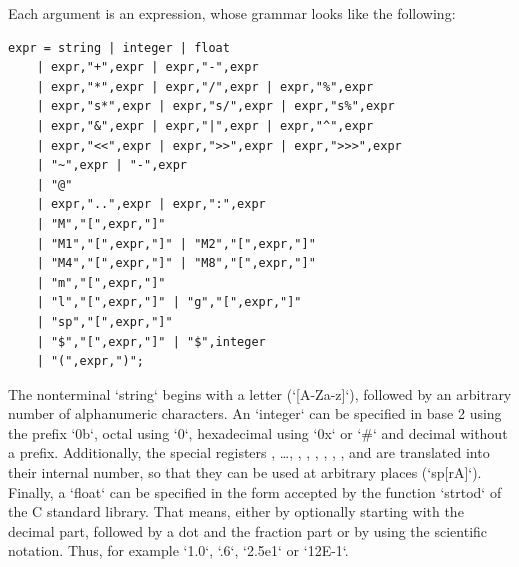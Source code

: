 Each argument is an expression, whose grammar looks like the following:
\begin{lstlisting}[caption=Grammar of expressions in \protect\gls{EBNF}]
expr = string | integer	| float
	| expr,"+",expr | expr,"-",expr
	| expr,"*",expr | expr,"/",expr | expr,"%",expr
	| expr,"s*",expr | expr,"s/",expr | expr,"s%",expr
	| expr,"&",expr | expr,"|",expr | expr,"^",expr
	| expr,"<<",expr | expr,">>",expr | expr,">>>",expr
	| "~",expr | "-",expr
	| "@"
	| expr,"..",expr | expr,":",expr
	| "M","[",expr,"]"
	| "M1","[",expr,"]" | "M2","[",expr,"]"
	| "M4","[",expr,"]" | "M8","[",expr,"]"
	| "m","[",expr,"]"
	| "l","[",expr,"]" | "g","[",expr,"]"
	| "sp","[",expr,"]"
	| "$","[",expr,"]" | "$",integer
	| "(",expr,")";
\end{lstlisting}
The nonterminal `string` begins with a letter (`[A-Za-z]`), followed by an arbitrary number of alphanumeric characters. An `integer` can be specified in base 2 using the prefix `0b`, octal using `0`, hexadecimal using `0x` or `#` and decimal without a prefix. Additionally, the special registers , \dots, , , , , , ,  and  are translated into their internal number, so that they can be used at arbitrary places (\eg `sp[rA]`). Finally, a `float` can be specified in the form accepted by the function `strtod` of the C standard library. That means, either by optionally starting with the decimal part, followed by a dot and the fraction part or by using the scientific notation. Thus, for example `1.0`, `.6`, `2.5e1` or `12E-1`.


